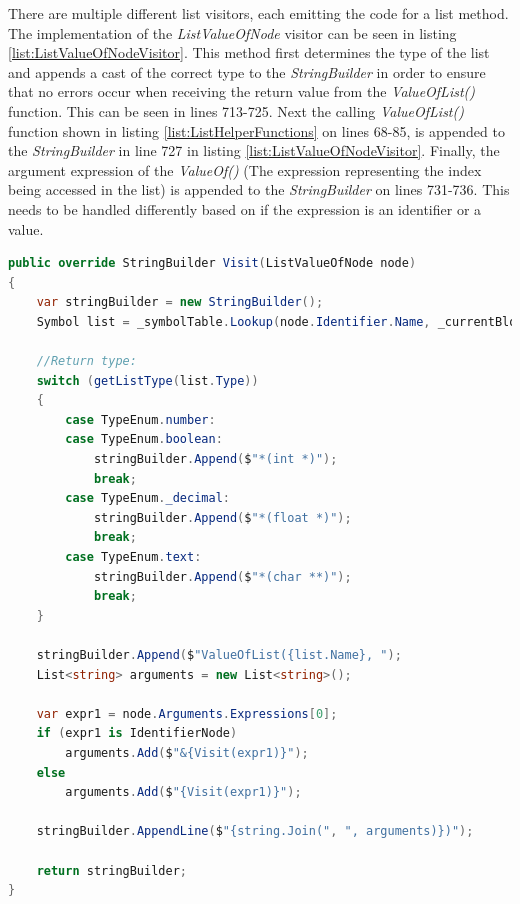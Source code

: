 There are multiple different list visitors, each emitting the code for a list method. The implementation of the \textit{ListValueOfNode} visitor can be seen in listing \ref{list:ListValueOfNodeVisitor}. This method first determines the type of the list and appends a cast of the correct type to the \textit{StringBuilder} in order to ensure that no errors occur when receiving the return value from the \textit{ValueOfList()} function. This can be seen in lines 713-725. Next the calling \textit{ValueOfList()} function shown in listing \ref{list:ListHelperFunctions} on lines 68-85, is appended to the \textit{StringBuilder} in line 727 in listing \ref{list:ListValueOfNodeVisitor}.  Finally, the argument expression of the \textit{ValueOf()} (The expression representing the index being accessed in the list) is appended to the \textit{StringBuilder} on lines 731-736. This needs to be handled differently based on if the expression is an identifier or a value.

\begin{lstlisting}[language = csharp, firstnumber=707, label={list:ListValueOfNodeVisitor},caption=Emitting the code for the list ValueOf node - CobraCompiler/Emitter.cs]
public override StringBuilder Visit(ListValueOfNode node)
{
    var stringBuilder = new StringBuilder();
    Symbol list = _symbolTable.Lookup(node.Identifier.Name, _currentBlock);

    //Return type:
    switch (getListType(list.Type))
    {
        case TypeEnum.number:
        case TypeEnum.boolean:
            stringBuilder.Append($"*(int *)");
            break;
        case TypeEnum._decimal:
            stringBuilder.Append($"*(float *)");
            break;
        case TypeEnum.text:
            stringBuilder.Append($"*(char **)");
            break;
    }

    stringBuilder.Append($"ValueOfList({list.Name}, ");
    List<string> arguments = new List<string>();

    var expr1 = node.Arguments.Expressions[0];
    if (expr1 is IdentifierNode)
        arguments.Add($"&{Visit(expr1)}");
    else
        arguments.Add($"{Visit(expr1)}");

    stringBuilder.AppendLine($"{string.Join(", ", arguments)})");

    return stringBuilder;
}
\end{lstlisting}


